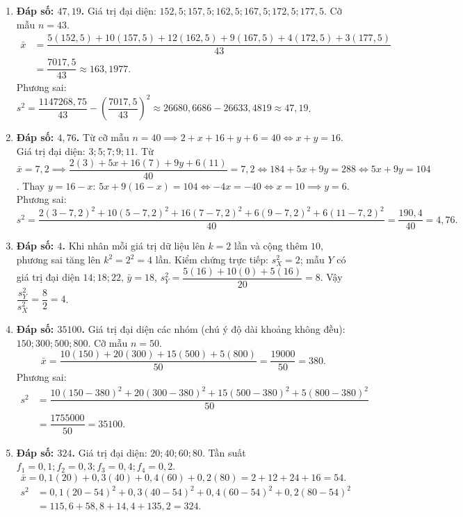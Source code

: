 \documentclass[12pt,a4paper]{article}
\begin{document}
\begin{enumerate}[start=11]
\item \textbf{Đáp số: $47{,}19$.}  
Giá trị đại diện: $152{,}5; 157{,}5; 162{,}5; 167{,}5; 172{,}5; 177{,}5$. Cỡ mẫu $n = 43$.  
\begin{align*}
\bar{x} &= \dfrac{5(152{,}5) + 10(157{,}5) + 12(162{,}5) + 9(167{,}5) + 4(172{,}5) + 3(177{,}5)}{43} \\
&= \dfrac{7017{,}5}{43} \approx 163{,}1977.
\end{align*}
Phương sai: $s^2 = \dfrac{1147268{,}75}{43} - \left(\dfrac{7017{,}5}{43}\right)^2 \approx 26680{,}6686 - 26633{,}4819 \approx 47{,}19$.

\item \textbf{Đáp số: $4{,}76$.}  
Từ cỡ mẫu $n = 40 \implies 2 + x + 16 + y + 6 = 40 \iff x + y = 16$.  
Giá trị đại diện: $3; 5; 7; 9; 11$.  
Từ $\bar{x} = 7{,}2 \implies \dfrac{2(3) + 5x + 16(7) + 9y + 6(11)}{40} = 7{,}2 \iff 184 + 5x + 9y = 288 \iff 5x + 9y = 104$.  
Thay $y = 16 - x$: $5x + 9(16 - x) = 104 \iff -4x = -40 \iff x = 10 \implies y = 6$.  
Phương sai:  
\[
s^2 = \dfrac{2(3-7{,}2)^2 + 10(5-7{,}2)^2 + 16(7-7{,}2)^2 + 6(9-7{,}2)^2 + 6(11-7{,}2)^2}{40} = \dfrac{190{,}4}{40} = 4{,}76.
\]

\item \textbf{Đáp số: $4$.}  
Khi nhân mỗi giá trị dữ liệu lên $k = 2$ lần và cộng thêm $10$, phương sai tăng lên $k^2 = 2^2 = 4$ lần.  
Kiểm chứng trực tiếp: $s_X^2 = 2$; mẫu $Y$ có giá trị đại diện $14; 18; 22$, $\bar{y} = 18$, $s_Y^2 = \dfrac{5(16) + 10(0) + 5(16)}{20} = 8$.  
Vậy $\dfrac{s_Y^2}{s_X^2} = \dfrac{8}{2} = 4$.

\item \textbf{Đáp số: $35100$.}  
Giá trị đại diện các nhóm (chú ý độ dài khoảng không đều): $150; 300; 500; 800$. Cỡ mẫu $n = 50$.  
\[
\bar{x} = \dfrac{10(150) + 20(300) + 15(500) + 5(800)}{50} = \dfrac{19000}{50} = 380.
\]
Phương sai:  
\begin{align*}
s^2 &= \dfrac{10(150 - 380)^2 + 20(300 - 380)^2 + 15(500 - 380)^2 + 5(800 - 380)^2}{50} \\
&= \dfrac{1755000}{50} = 35100.
\end{align*}

\item \textbf{Đáp số: $324$.}  
Giá trị đại diện: $20; 40; 60; 80$. Tần suất $f_1 = 0{,}1; f_2 = 0{,}3; f_3 = 0{,}4; f_4 = 0{,}2$.  
\[
\bar{x} = 0{,}1(20) + 0{,}3(40) + 0{,}4(60) + 0{,}2(80) = 2 + 12 + 24 + 16 = 54.
\]
\begin{align*}
s^2 &= 0{,}1(20 - 54)^2 + 0{,}3(40 - 54)^2 + 0{,}4(60 - 54)^2 + 0{,}2(80 - 54)^2 \\
&= 115{,}6 + 58{,}8 + 14{,}4 + 135{,}2 = 324.
\end{align*}


\end{enumerate}
\end{document}

